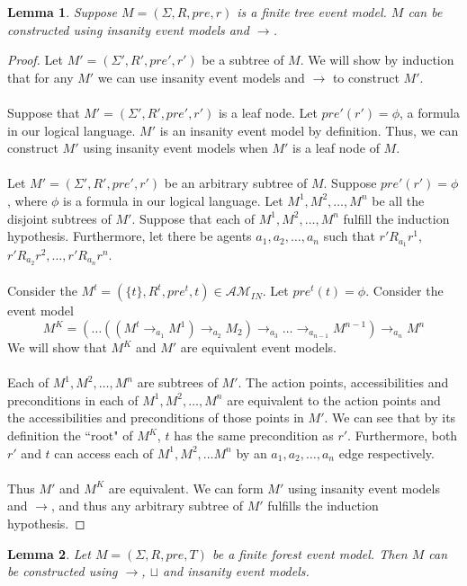 \documentclass[12pt, a4paper, titlepage]{scrartcl}
\newtheorem{lemma}{Lemma}[subsection]
\numberwithin{equation}{section}
\newcommand{\eventClass}{\mathcal{AM}}
\newcommand{\insaneClass}{\eventClass_{IN}}
\begin{document}
\begin{lemma} \label{finTreeConstruct}
Suppose $M = (\Sigma, R, pre, r)$ is a finite tree event model.
$M$ can be constructed using insanity event models and $\to$.
\end{lemma}
\begin{proof}
Let $M' = (\Sigma', R', pre', r')$ be a subtree of $M$.
We will show by induction that for any $M'$ we can use insanity event models and $\to$ to
construct $M'$.\\
\\
Suppose that $M' = (\Sigma', R', pre', r')$ is a leaf node.
Let $pre'(r') = \phi$, a formula in our logical language.
$M'$ is an insanity event model by definition.
Thus, we can construct $M'$ using insanity event models when $M'$ is a leaf node of $M$.\\
\\
Let $M' = (\Sigma', R', pre', r')$ be an arbitrary subtree of $M$.
Suppose $pre'(r') = \phi$, where $\phi$ is a formula in our logical language.
Let $M^1, M^2, \ldots, M^n$ be all the disjoint subtrees of $M'$.
Suppose that each of $M^1, M^2, \ldots, M^n$ fulfill the induction hypothesis.
Furthermore, let there be agents $a_1, a_2, \ldots, a_n$ such that $r' R_{a_1} r^1$, $r' R_{a_2} r^2,
	\ldots, r' R_{a_n} r^n$.\\
\\
Consider the $M^t = (\{ t \}, R^t, pre^t, t) \in \insaneClass$.
Let $pre^t(t) = \phi$.
Consider the event model 
\[
M^K = (\ldots((M^t \to_{a_1} M ^ 1) \to_{a_2} M_2) \to_{a_3} \ldots
\to_{a_{n-1}} M^{n-1} ) \to_{a_n} M ^ n
\]
We will show that $M^K$ and $M'$ are equivalent event models.\\
\\
Each of $M^1, M^2, \ldots, M^n$ are subtrees of $M'$.
The action points, accessibilities and preconditions in each of $M^1, M^2, \ldots, M^n$ are
equivalent to the action points and the accessibilities and preconditions of those points in $M'$.
We can see that by its definition the ``root" of $M^K$, $t$ has the same precondition as $r'$.
Furthermore, both $r'$ and $t$ can access each of $M^1, M^2, \ldots M^n$ by an $a_1, a_2, \ldots, a_n$ edge
respectively.\\
\\
Thus $M'$ and $M^K$ are equivalent.
We can form $M'$ using insanity event models and $\to$, and thus any arbitrary subtree of $M'$
fulfills the induction hypothesis.
\end{proof}

\begin{lemma} \label{forestCon}
Let $M = (\Sigma, R, pre, T)$ be a finite forest event model.
Then $M$ can be constructed using $\to$, $\sqcup$ and insanity event models.
\end{lemma}
\end{document}
